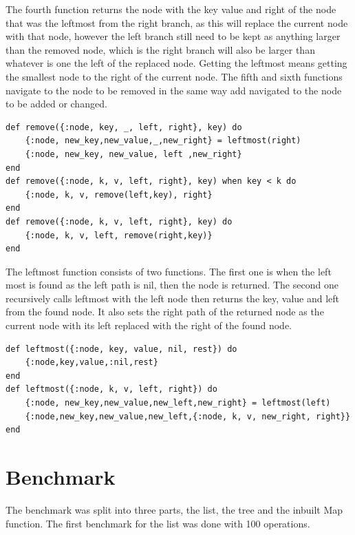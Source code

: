 \documentclass[a4paper,11pt]{article}
\begin{document}
The fourth function returns the node with the key value and right of the node that was the leftmost from the right branch, as this will replace the current node with that node, however the left branch still need to be kept as anything larger than the removed node, which is the right branch will also be larger than whatever is one the left of the replaced node. Getting the leftmost means getting the smallest node to the right of the current node. 
The fifth and sixth functions navigate to the node to be removed in the same way add navigated to the node to be added or changed.
\begin{verbatim}
def remove({:node, key, _, left, right}, key) do
    {:node, new_key,new_value,_,new_right} = leftmost(right)
    {:node, new_key, new_value, left ,new_right}
end
def remove({:node, k, v, left, right}, key) when key < k do
    {:node, k, v, remove(left,key), right}
end
def remove({:node, k, v, left, right}, key) do
    {:node, k, v, left, remove(right,key)}
end
\end{verbatim}
The leftmost function consists of two functions. The first one is when the left most is found as the left path is nil, then the node is returned. The second one recursively calls leftmost with the left node then returns the key, value and left from the found node. It also sets the right path of the returned node as the current node with its left replaced with the right of the found node. 
\begin{verbatim}
def leftmost({:node, key, value, nil, rest}) do
    {:node,key,value,:nil,rest}
end
def leftmost({:node, k, v, left, right}) do
    {:node, new_key,new_value,new_left,new_right} = leftmost(left)
    {:node,new_key,new_value,new_left,{:node, k, v, new_right, right}}
end
\end{verbatim}

\section*{Benchmark}
The benchmark was split into three parts, the list, the tree and the inbuilt Map function. The first benchmark for the list was done with 100 operations.
\end{document}
